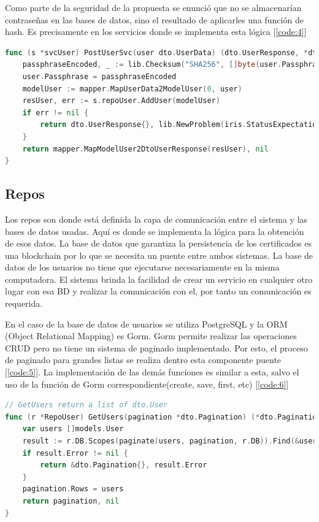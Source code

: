 Como parte de la seguridad de la propuesta se enunció que no se almacenarían contraseñas en las bases de datos, sino el resultado de aplicarles una función de hash. Es precisamente en los servicios donde se implementa esta lógica [\ref{code:4}]

\begin{lstlisting}[language=Go,caption={Servicio para crear un usuario}, label={code:4}]
func (s *svcUser) PostUserSvc(user dto.UserData) (dto.UserResponse, *dto.Problem) {
	passphraseEncoded, _ := lib.Checksum("SHA256", []byte(user.Passphrase))
	user.Passphrase = passphraseEncoded
	modelUser := mapper.MapUserData2ModelUser(0, user)
	resUser, err := s.repoUser.AddUser(modelUser)
	if err != nil {
		return dto.UserResponse{}, lib.NewProblem(iris.StatusExpectationFailed, schema.ErrBuntdb, err.Error())
	}
	return mapper.MapModelUser2DtoUserResponse(resUser), nil
}
\end{lstlisting}

\subsection{Repos}
Los repos son donde está definida la capa de comunicación entre el sistema y las bases de datos usadas. Aquí es donde se implementa la lógica para la obtención de esos datos. La base de datos que garantiza la persistencia de los certificados es una blockchain por lo que se necesita un puente entre ambos sistemas. La base de datos de los usuarios no tiene que ejecutarse necesariamente en la misma computadora. El sistema brinda la facilidad de crear un servicio en cualquier otro lugar con esa BD y realizar la comunicación con el, por tanto un comunicación es requerida.

En el caso de la base de datos de usuarios se utiliza PostgreSQL y la ORM (Object Relational Mapping) es Gorm. Gorm permite realizar las operaciones CRUD pero no tiene un sistema de paginado implementado. Por esto, el proceso de paginado para grandes listas se realiza dentro esta componente puente [\ref{code:5}]. La implementación de las demás funciones es similar a esta, salvo el uso de la función de Gorm correspondiente(create, save, first, etc) [\ref{code:6}]

\begin{lstlisting}[language=Go,caption={Función que consulta los usuarios}, label={code:5}]
// GetUsers return a list of dto.User
func (r *RepoUser) GetUsers(pagination *dto.Pagination) (*dto.Pagination, error) {
	var users []models.User
	result := r.DB.Scopes(paginate(users, pagination, r.DB)).Find(&users)
	if result.Error != nil {
		return &dto.Pagination{}, result.Error
	}
	pagination.Rows = users
	return pagination, nil
}
\end{lstlisting}

